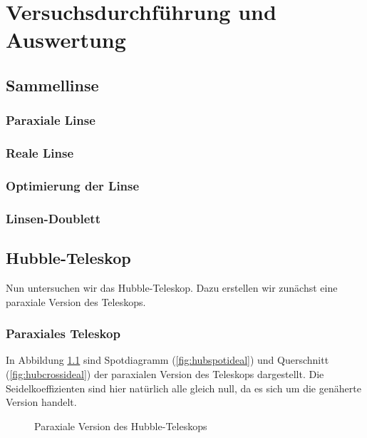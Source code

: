 \documentclass[twoside,colorback,accentcolor=tud4c,11pt]{tudreport}
\begin{document}
\chapter{Versuchsdurchführung und Auswertung}
\section{Sammellinse}
\subsection{Paraxiale Linse}
\subsection{Reale Linse}
\subsection{Optimierung der Linse}
\subsection{Linsen-Doublett}
\section{Hubble-Teleskop}
Nun untersuchen wir das Hubble-Teleskop. Dazu erstellen wir zunächst eine paraxiale Version des Teleskops.
\subsection{Paraxiales Teleskop}
In Abbildung \ref{fig:hubideal} sind Spotdiagramm (\ref{fig:hubspotideal}) und Querschnitt (\ref{fig:hubcrossideal}) der paraxialen Version des Teleskops dargestellt. Die Seidelkoeffizienten sind hier natürlich alle gleich null, da es sich um die genäherte Version handelt.
\begin{figure}[H]
\centering
  \quad
  \quad   
  \caption{Paraxiale Version des Hubble-Teleskops}
  \label{fig:hubideal}
\end{figure}
\end{document}
